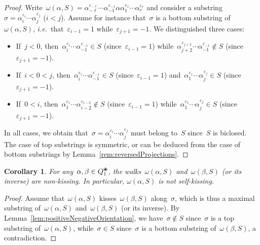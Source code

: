 \documentclass{amsart}
\newtheorem{corollary}[theorem]{Corollary}
\theoremstyle{definition}
\newcommand{\ie}{\textit{i.e.}~} %
\newcommand{\blossom}{^\text{\ding{96}}} %
\begin{document}
\begin{proof}
Write~$\omega(\alpha,S) = \alpha_{-\ell}^{\varepsilon_{-\ell}} \cdots \alpha_{-1}^{\varepsilon_{-1}} \alpha \alpha_1^{\varepsilon_1} \cdots \alpha_r^{\varepsilon_r}$ and consider a substring~$\sigma = \alpha_i^{\varepsilon_i} \cdots \alpha_j^{\varepsilon_j}$ ($i < j$).
Assume for instance that~$\sigma$ is a bottom substring of~$\omega(\alpha,S)$, \ie that~$\varepsilon_{i-1} = 1$ while~$\varepsilon_{j+1} = -1$.
We distinguished three cases:
\begin{itemize}
\item If~$j < 0$, then~$\alpha_i^{\varepsilon_i} \cdots \alpha_{-1}^{\varepsilon_{-1}} \in S$ (since~$\varepsilon_{i-1} = 1$) while~$\alpha_{j+2}^{\varepsilon_{j+2}} \cdots \alpha_{-1}^{\varepsilon_{-1}} \notin S$ (since~$\varepsilon_{j+1} = -1$).
\item If~$i < 0 < j$, then~$\alpha_i^{\varepsilon_i} \cdots \alpha_{-1}^{\varepsilon_{-1}} \in S$  (since~$\varepsilon_{i-1} = 1$) and~$\alpha_1^{\varepsilon_1} \cdots \alpha_j^{\varepsilon_j} \in S$ (since~${\varepsilon_{j+1} = -1}$).
\item If~$0 < i$, then~$\alpha_1^{\varepsilon_1} \cdots \alpha_{i-2}^{\varepsilon_{i-2}} \notin S$ (since~$\varepsilon_{i-1} = 1$) while~$\alpha_1^{\varepsilon_1} \cdots \alpha_j^{\varepsilon_j} \in S$ (since~$\varepsilon_{j+1} = -1$).
\end{itemize}
In all cases, we obtain that~$\sigma = \alpha_i^{\varepsilon_i} \cdots \alpha_j^{\varepsilon_j}$ must belong to~$S$ since~$S$ is biclosed.
The case of top substrings is symmetric, or can be deduced from the case of bottom substrings by Lemma~\ref{rem:reversedProjections}.
\end{proof}

\begin{corollary}
\label{coro:surjectionNonKissingWalks}
For any~$\alpha, \beta \in Q_1\blossom$, the walks~$\omega(\alpha,S)$ and~$\omega(\beta,S)$ (or its inverse) are non-kissing.
In particular, $\omega(\alpha,S)$ is not self-kissing.
\end{corollary}

\begin{proof}
Assume that~$\omega(\alpha,S)$ kisses~$\omega(\beta,S)$ along~$\sigma$, which is thus a maximal substring of~$\omega(\alpha,S)$ and~$\omega(\beta,S)$ (or its inverse).
By Lemma~\ref{lem:positiveNegativeOrientation}, we have~$\sigma \notin S$ since~$\sigma$ is a top substring of~$\omega(\alpha,S)$, while~$\sigma \in S$ since~$\sigma$ is a bottom substring of~$\omega(\beta,S)$, a contradiction.
\end{proof}
\end{document}

